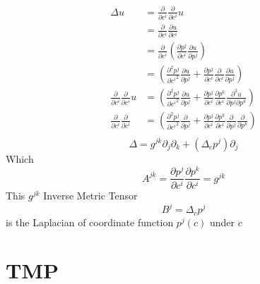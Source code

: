 \[
    \begin{aligned}
        \Delta u                                                    & =\frac{\partial}{\partial c^i}\frac{\partial}{\partial c^i}u                                                                                                                                                     \\
                                                                    & =\frac{\partial}{\partial c^i}\frac{\partial u}{\partial c^i}                                                                                                                                                    \\
                                                                    & =\frac{\partial}{\partial c^i}\left(\frac{\partial p^j}{\partial c^i}\frac{\partial u}{\partial p^j}\right)                                                                                                      \\
                                                                    & =\left(\frac{\partial^2 p^j}{\partial {c^i}^2}\frac{\partial u}{\partial p^j}+\frac{\partial p^j}{\partial c^i}\frac{\partial}{\partial c^i}\frac{\partial u}{\partial p^j}\right)                               \\
        \frac{\partial}{\partial c^i}\frac{\partial}{\partial c^i}u & =\left(\frac{\partial^2 p^j}{\partial {c^i}^2}\frac{\partial u}{\partial p^j}+\frac{\partial p^j}{\partial c^i}\frac{\partial p^k}{\partial c^i}\frac{\partial^2 u}{\partial p^j\partial p^k}\right)             \\
        \frac{\partial}{\partial c^i}\frac{\partial}{\partial c^i}  & =\left(\frac{\partial^2 p^j}{\partial {c^i}^2}\frac{\partial }{\partial p^j}+\frac{\partial p^j}{\partial c^i}\frac{\partial p^k}{\partial c^i}\frac{\partial}{\partial p^j}\frac{\partial}{\partial p^k}\right) \\
    \end{aligned}
\]
\[
    \boxed{
        \Delta=g^{jk}\partial_j\partial_k
        +(\Delta_c p^j)\partial_j
    }
\]
Which
\[
    \boxed{
        A^{jk}=
        \frac{\partial p^j}{\partial c^i}
        \frac{\partial p^k}{\partial c^i}
        =g^{jk}
    }
\]
This \(g^{jk}\) Inverse Metric Tensor
\[
    B^j=\Delta_c p^j
\]
is the Laplacian of coordinate function \(p^j(c)\) under \(c\)




\section{TMP}


